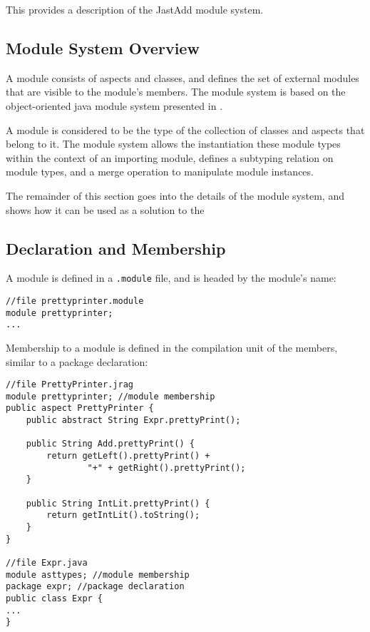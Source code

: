 This provides a description of the JastAdd module system.

\subsection{Module System Overview}

A module consists of aspects and classes, and defines the set of external
modules that are visible to the module's members. The module system is based
on the object-oriented java module system presented in \cite{modulesastypes}.

A module is considered to be the type of the collection of classes and aspects
that belong to it. The module system allows the instantiation these module types
within the context of an importing module, defines a subtyping relation
on module types, and a merge operation to manipulate module instances.

The remainder of this section goes into the details of the module system, and shows
how it can be used as a solution to the 

\subsection{Declaration and Membership}

A module is defined in a \texttt{.module} file, and is headed by the module's name:

\begin{lstlisting}[caption={Module Declaration}]
//file prettyprinter.module
module prettyprinter;
...
\end{lstlisting}

Membership to a module is defined in the compilation unit of the members,
similar to a package declaration:

\begin{lstlisting}[caption={Module Membership}]
//file PrettyPrinter.jrag
module prettyprinter; //module membership
public aspect PrettyPrinter {
	public abstract String Expr.prettyPrint();
	
	public String Add.prettyPrint() {
		return getLeft().prettyPrint() + 
				"+" + getRight().prettyPrint();
	}
	
	public String IntLit.prettyPrint() {
		return getIntLit().toString();
	}
}

//file Expr.java
module asttypes; //module membership
package expr; //package declaration
public class Expr {
...
}
\end{lstlisting}


